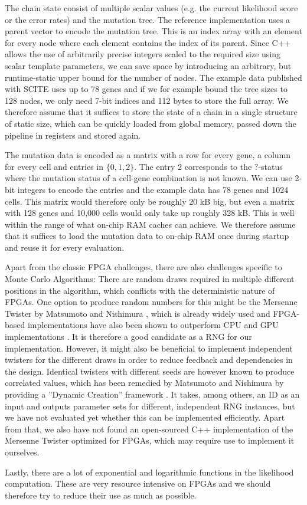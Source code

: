 The chain state consist of multiple scalar values (e.g. the current likelihood score or the error rates) and the mutation tree. The reference implementation uses a parent vector to encode the mutation tree. This is an index array with an element for every node where each element contains the index of its parent. Since C++ allows the use of arbitrarily precise integers scaled to the required size using scalar template parameters, we can save space by introducing an arbitrary, but runtime-static upper bound for the number of nodes. The example data published with \ac{SCITE} uses up to 78 genes and if we for example bound the tree sizes to 128 nodes, we only need 7-bit indices and 112 bytes to store the full array. We therefore assume that it suffices to store the state of a chain in a single structure of static size, which can be quickly loaded from global memory, passed down the pipeline in registers and stored again.

The mutation data is encoded as a matrix with a row for every gene, a column for every cell and entries in $\{0, 1, 2\}$. The entry $2$ corresponds to the $?$-status where the mutation status of a cell-gene combination is not known. We can use 2-bit integers to encode the entries and the example data has 78 genes and 1024 cells. This matrix would therefore only be roughly 20 kB big, but even a matrix with 128 genes and 10,000 cells would only take up roughly 328 kB. This is well within the range of what on-chip RAM caches can achieve. We therefore assume that it suffices to load the mutation data to on-chip RAM once during startup and reuse it for every evaluation.

Apart from the classic \ac{FPGA} challenges, there are also challenges specific to Monte Carlo Algorithms: There are random draws required in multiple different positions in the algorithm, which conflicts with the deterministic nature of \acp{FPGA}. One option to produce random numbers for this might be the Mersenne Twister by Matsumoto and Nishimura \cite{matsumoto1998mersenne}, which is already widely used and \ac{FPGA}-based implementations have also been shown to outperform CPU and GPU implementations \cite{tian2009mersenne}. It is therefore a good candidate as a \ac{RNG} for our implementation. However, it might also be beneficial to implement independent twisters for the different draws in order to reduce feedback and dependencies in the design. Identical twisters with different seeds are however known to produce correlated values, which has been remedied by Matsumoto and Nishimura by providing a ''Dynamic Creation'' framework \cite{matsumoto2000dynamic}. It takes, among others, an ID as an input and outputs parameter sets for different, independent \ac{RNG} instances, but we have not evaluated yet whether this can be implemented efficiently. Apart from that, we also have not found an open-sourced C++ implementation of the Mersenne Twister optimized for FPGAs, which may require use to implement it ourselves.

Lastly, there are a lot of exponential and logarithmic functions in the likelihood computation. These are very resource intensive on \acp{FPGA} and we should therefore try to reduce their use as much as possible.
